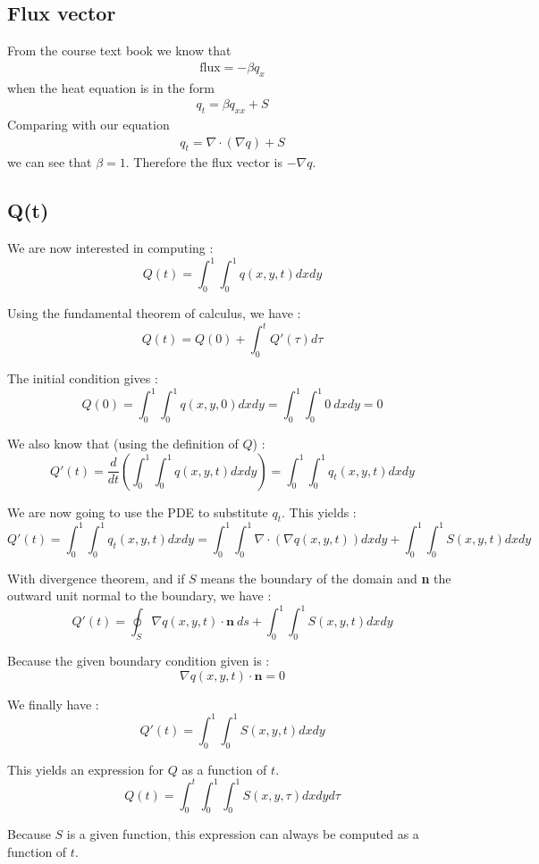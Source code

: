 \subsection{Flux vector}

From the course text book we know that 
\begin{align*}
\text{flux} = - \beta q_x
\end{align*}
when the heat equation is in the form
\begin{align*}
q_t = \beta q_{xx} + S
\end{align*}
Comparing with our equation
\begin{align*}
q_t = \nabla \cdot (\nabla q) + S
\end{align*}
we can see that $\beta = 1$. Therefore the flux vector is $-\nabla q$.
\subsection{Q(t)}

We are now interested in computing : 
$$Q(t) = \int_0^1\int_0^1 q(x,y,t)dxdy$$

Using the fundamental theorem of calculus, we have :
$$Q(t) = Q(0) + \int_0^t Q'(\tau)d\tau$$

The initial condition gives :
$$Q(0) =\int_0^1\int_0^1 q(x,y,0)dxdy = \int_0^1\int_0^1 0 \: dxdy = 0$$

We also know that (using the definition of $Q$) :
$$Q'(t) = \frac{d}{dt}(\int_0^1\int_0^1 q(x,y,t)dxdy)=\int_0^1\int_0^1 q_t(x,y,t)dxdy$$

We are now going to use the PDE to substitute $q_t$. This yields :
$$Q'(t) = \int_0^1\int_0^1 q_t(x,y,t)dxdy = \int_0^1\int_0^1 \nabla \cdot (\nabla q(x,y,t))dxdy+\int_0^1\int_0^1 S(x,y,t) dxdy$$

With divergence theorem, and if $S$ means the boundary of the domain and \textbf{n} the outward unit normal to the boundary, we have : 
$$Q'(t) = \oint_S \nabla q(x,y,t)\cdot \textbf{n} \: ds + \int_0^1\int_0^1 S(x,y,t)dxdy$$

Because the given boundary condition given is :
$$\nabla q(x,y,t)\cdot \textbf{n} = 0$$

We finally have : 
$$Q'(t) = \int_0^1\int_0^1 S(x,y,t)dxdy$$

This yields an expression for $Q$ as a function of $t$.
$$Q(t) = \int_0^t\int_0^1\int_0^1 S(x,y,\tau)dxdyd\tau$$

Because $S$ is a given function, this expression can always be computed as a function of $t$.
